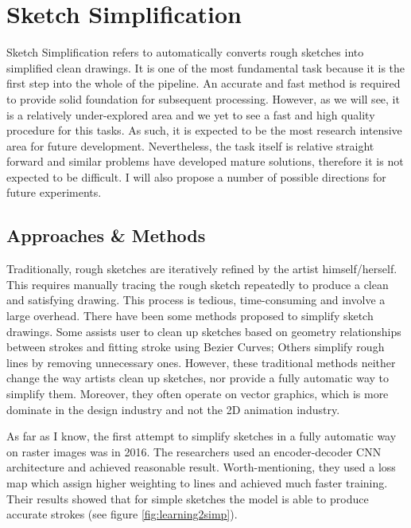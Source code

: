 \chapter{Sketch Simplification}

Sketch Simplification refers to automatically converts rough sketches into simplified clean drawings. It is one of the most fundamental task because it is the first step into the whole of the pipeline. An accurate and fast method is required to provide solid foundation for subsequent processing. However, as we will see, it is a relatively under-explored area and we yet to see a fast and high quality procedure for this tasks. As such, it is expected to be the most research intensive area for future development. Nevertheless, the task itself is relative straight forward and similar problems have developed mature solutions, therefore it is not expected to be difficult. I will also propose a number of possible directions for future experiments.

\label{chapterlabel4}
\section{Approaches \& Methods}
Traditionally, rough sketches are iteratively refined by the artist himself/herself. This requires manually tracing the rough sketch repeatedly to produce a clean and satisfying drawing. This process is tedious, time-consuming and involve a large overhead. There have been some methods proposed to simplify sketch drawings. Some assists user to clean up sketches based on geometry relationships between strokes\cite{fiserShipShapeDrawingBeautification2015} and fitting stroke using Bezier Curves\cite{baeILoveSketchAsnaturalaspossibleSketching2008}; Others simplify rough lines by removing unnecessary ones\cite{liuClosureawareSketchSimplification2015}. However, these traditional methods neither change the way artists clean up sketches, nor provide a fully automatic way to simplify them. Moreover, they often operate on vector graphics, which is more dominate in the design industry and not the 2D animation industry.

As far as I know, the first attempt to simplify sketches in a fully automatic way on raster images was in 2016\cite{simo-serraLearningSimplifyFully2016}. The researchers used an encoder-decoder CNN architecture and achieved reasonable result. Worth-mentioning, they used a loss map which assign higher weighting to lines and achieved much faster training. Their results showed that for simple sketches the model is able to produce accurate strokes (see figure \ref{fig:learning2simp}).

